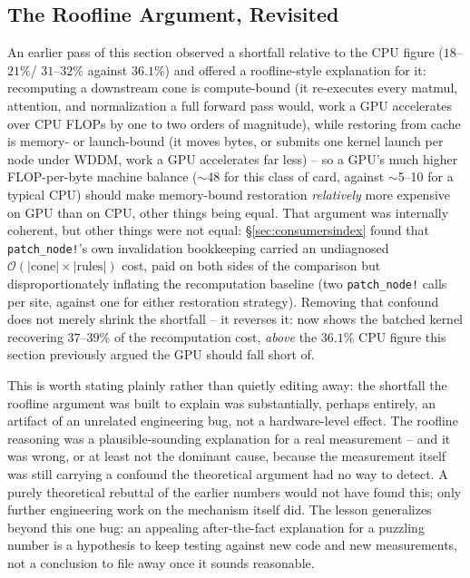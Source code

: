 \documentclass{article}
\begin{document}
\subsection{The Roofline Argument, Revisited}
\label{sec:roofline}

An earlier pass of this section observed a shortfall relative to the CPU figure ($18$--$21\%$/
$31$--$32\%$ against $36.1\%$) and offered a roofline-style explanation \cite{roofline} for it:
recomputing a downstream cone is compute-bound (it re-executes every matmul, attention, and
normalization a full forward pass would, work a GPU accelerates over CPU FLOPs by one to two
orders of magnitude), while restoring from cache is memory- or launch-bound (it moves bytes, or
submits one kernel launch per node under WDDM, work a GPU accelerates far less) -- so a GPU's much
higher FLOP-per-byte machine balance ($\sim$48 for this class of card, against $\sim$5--10 for a
typical CPU) should make memory-bound restoration \emph{relatively} more expensive on GPU than on
CPU, other things being equal. That argument was internally coherent, but other things were not
equal: \S\ref{sec:consumersindex} found that \texttt{patch\_node!}'s own invalidation bookkeeping
carried an undiagnosed $\mathcal{O}(|\text{cone}|\times|\text{rules}|)$ cost, paid on both sides of
the comparison but disproportionately inflating the recomputation baseline (two
\texttt{patch\_node!} calls per site, against one for either restoration strategy). Removing that
confound does not merely shrink the shortfall -- it reverses it:  now shows the
batched kernel recovering $37$--$39\%$ of the recomputation cost, \emph{above} the $36.1\%$ CPU
figure this section previously argued the GPU should fall short of.

This is worth stating plainly rather than quietly editing away: the shortfall the roofline argument
was built to explain was substantially, perhaps entirely, an artifact of an unrelated engineering
bug, not a hardware-level effect. The roofline reasoning was a plausible-sounding explanation for a
real measurement -- and it was wrong, or at least not the dominant cause, because the measurement
itself was still carrying a confound the theoretical argument had no way to detect. A purely
theoretical rebuttal of the earlier numbers would not have found this; only further engineering
work on the mechanism itself did. The lesson generalizes beyond this one bug: an appealing
after-the-fact explanation for a puzzling number is a hypothesis to keep testing against new code
and new measurements, not a conclusion to file away once it sounds reasonable.
\end{document}
